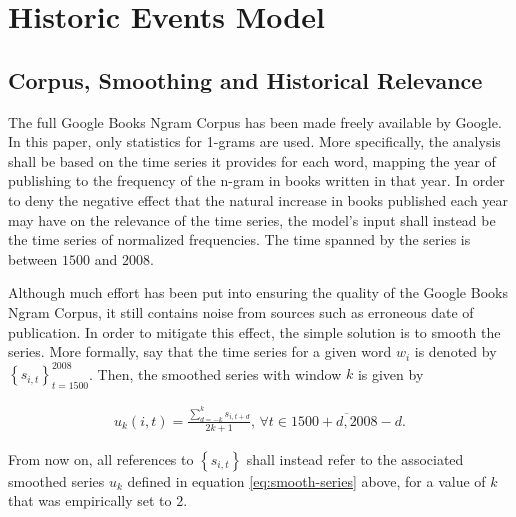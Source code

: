 \chapter{Historic Events Model}
\label{chapter:hist-ev-model}

\section{Corpus, Smoothing and Historical Relevance}
\label{sec:corpus-smoothing-relevance}

The full Google Books Ngram Corpus has been made freely available by Google. In this paper, only statistics for 1-grams are used. More specifically, the analysis shall be based on the time series it provides for each word, mapping the year of publishing to the frequency of the n-gram in books written in that year. In order to deny the negative effect that the natural increase in books published each year may have on the relevance of the time series, the model's input shall instead be the time series of normalized frequencies. The time spanned by the series is between $1500$ and $2008$.

Although much effort has been put into ensuring the quality of the Google Books Ngram Corpus, it still contains noise from sources such as erroneous date of publication. In order to mitigate this effect, the simple solution is to smooth the series. More formally, say that the time series for a given word $w_i$ is denoted by $\left\{ s_{i, t} \right\}_{t = 1500}^{2008}$. Then, the smoothed series with window $k$ is given by

\begin{align}
\label{eq:smooth-series}
u_{k} \left( i, t \right) = \frac{\sum_{d = -k}^{k} s_{i, t + d}}{2k + 1}, \, \forall t \in \overline{1500 + d, 2008 - d}.
\end{align}

From now on, all references to $\left\{ s_{i, t} \right\}$ shall instead refer to the associated smoothed series $u_k$ defined in equation \eqref{eq:smooth-series} above, for a value of $k$ that was empirically set to $2$.

